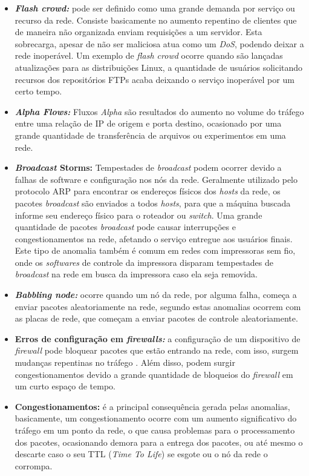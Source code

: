 \begin{itemize}
  \item \textbf{\textit{Flash crowd:}} pode ser definido como uma grande demanda por serviço ou recurso da rede. Consiste basicamente no aumento repentino de clientes que de maneira não organizada enviam requisições a um servidor. Esta sobrecarga, apesar de não ser maliciosa atua como um \textit{DoS}, podendo deixar a rede inoperável. Um exemplo de \textit{flash crowd} ocorre quando são lançadas atualizações para as distribuições Linux, a quantidade de usuários solicitando recursos dos repositórios FTPs acaba deixando o serviço inoperável por um certo tempo.
  \item \textbf{\textit{Alpha Flows:}} Fluxos \textit{Alpha} são resultados do aumento no volume do tráfego entre uma relação de IP de origem e porta destino, ocasionado por uma grande quantidade de transferência de arquivos ou experimentos em uma rede.
  \item \textbf{\textit{Broadcast} Storms:} Tempestades de \textit{broadcast} podem ocorrer devido a falhas de software e configuração nos nós da rede. Geralmente utilizado pelo protocolo ARP para encontrar os endereços físicos dos \textit{hosts} da rede, os pacotes \textit{broadcast} são enviados a todos \textit{hosts}, para que a máquina buscada informe seu endereço físico para o roteador ou \textit{switch}. Uma grande quantidade de pacotes \textit{broadcast}  pode causar interrupções e congestionamentos na rede, afetando o serviço entregue aos usuários finais. Este tipo de anomalia também é comum em redes com impressoras sem fio, onde os \textit{softwares} de controle da impressora disparam tempestades de \textit{broadcast} na rede em busca da impressora caso ela seja removida.
  \item \textbf{\textit{Babbling node:}} ocorre quando um nó da rede, por alguma falha, começa a enviar pacotes aleatoriamente na rede, segundo  estas anomalias ocorrem com as placas de rede, que começam a enviar pacotes de controle aleatoriamente.
  \item \textbf{Erros de configuração em \textit{firewalls:}} a configuração de um dispositivo de \textit{firewall} pode bloquear pacotes que estão entrando na rede, com isso, surgem mudanças repentinas no tráfego \cite{Zarpelao2010}. Além disso, podem surgir congestionamentos devido a grande quantidade de bloqueios do \textit{firewall} em um curto espaço de tempo.
  \item \textbf{Congestionamentos:} é a principal consequência gerada pelas anomalias, basicamente, um congestionamento ocorre com um aumento significativo do tráfego em um ponto da rede, o que causa problemas para o processamento dos pacotes, ocasionando demora para a entrega dos pacotes, ou até mesmo o descarte caso o seu TTL (\textit{Time To Life}) se esgote ou o nó da rede o corrompa.
\end{itemize}


